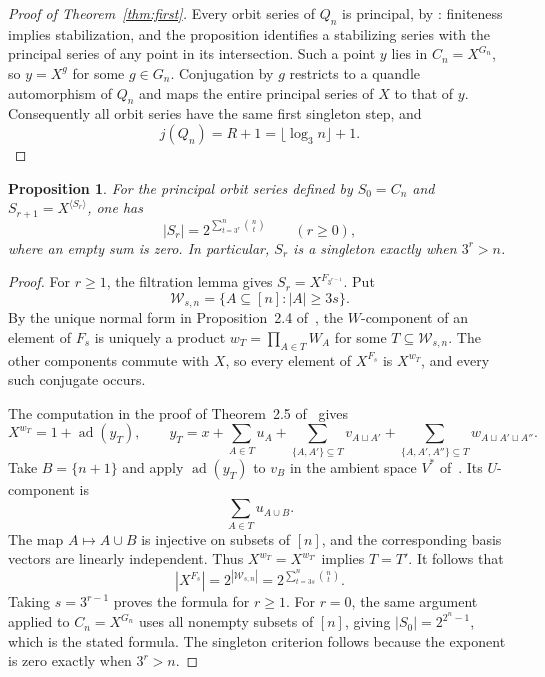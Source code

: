 \documentclass[11pt,a4paper]{article}
\newtheorem{proposition}[theorem]{Proposition}
\theoremstyle{definition}
\theoremstyle{remark}
\newcommand{\ad}{\operatorname{ad}}
\begin{document}
\begin{proof}[Proof of Theorem~\ref{thm:first}]
Every orbit series of \(Q_n\) is principal, by
\cite[Proposition~4.6 and Corollary~4.8]{BCNW}: finiteness implies
stabilization, and the proposition identifies a stabilizing series with
the principal series of any point in its intersection. Such a point
\(y\) lies in \(C_n=X^{G_n}\), so \(y=X^g\) for some \(g\in G_n\).
Conjugation by \(g\) restricts to a quandle automorphism of \(Q_n\)
and maps the entire principal series of \(X\) to that of \(y\).
Consequently all orbit series have the same first singleton step, and
\[
\boxed{j(Q_n)=R+1=\lfloor\log_3n\rfloor+1.}
\]
\end{proof}

\begin{proposition}\label{prop:orbit-cardinalities}
For the principal orbit series defined by
\(S_0=C_n\) and \(S_{r+1}=X^{\langle S_r\rangle}\), one has
\[
 |S_r|=2^{\displaystyle\sum_{t=3^r}^{n}\binom nt}
 \qquad(r\ge0),
\]
where an empty sum is zero. In particular, \(S_r\) is a singleton
exactly when \(3^r>n\).
\end{proposition}
\begin{proof}
For \(r\ge1\), the filtration lemma gives
\(S_r=X^{F_{3^{r-1}}}\). Put
\[
 \mathcal W_{s,n}=\{A\subseteq[n]: |A|\ge3s\}.
\]
By the unique normal form in Proposition~2.4 of~\cite{NTT}, the
\(W\)-component of an element of \(F_s\) is uniquely a product
\(w_T=\prod_{A\in T}W_A\) for some \(T\subseteq\mathcal W_{s,n}\).
The other components commute with \(X\), so every element of
\(X^{F_s}\) is \(X^{w_T}\), and every such conjugate occurs.

The computation in the proof of Theorem~2.5 of~\cite{NTT} gives
\[
 X^{w_T}=1+\ad(y_T),\qquad
 y_T=x+\sum_{A\in T}u_A
 +\sum_{\{A,A'\}\subseteq T}v_{A\sqcup A'}
 +\sum_{\{A,A',A''\}\subseteq T}w_{A\sqcup A'\sqcup A''}.
\]
Take \(B=\{n+1\}\) and apply \(\ad(y_T)\) to \(v_B\) in the
ambient space \(V^*\) of~\cite{NTT}. Its \(U\)-component is
\[
 \sum_{A\in T}u_{A\cup B}.
\]
The map \(A\mapsto A\cup B\) is injective on subsets of \([n]\), and
the corresponding basis vectors are linearly independent. Thus
\(X^{w_T}=X^{w_{T'}}\) implies \(T=T'\). It follows that
\[
 |X^{F_s}|=2^{|\mathcal W_{s,n}|}
 =2^{\sum_{t=3s}^{n}\binom nt}.
\]
Taking \(s=3^{r-1}\) proves the formula for \(r\ge1\). For \(r=0\),
the same argument applied to \(C_n=X^{G_n}\) uses all nonempty
subsets of \([n]\), giving \(|S_0|=2^{2^n-1}\), which is the stated
formula. The singleton criterion follows because the exponent is zero
exactly when \(3^r>n\).
\end{proof}
\end{document}
